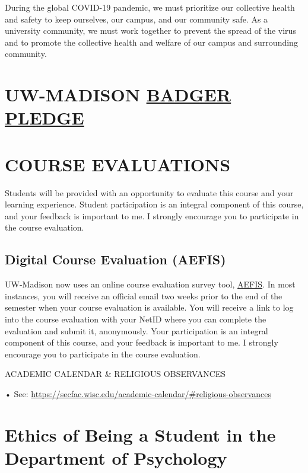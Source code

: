 \documentclass[11pt,man]{article}
\begin{document}
During the global COVID-19 pandemic, we must prioritize our collective
health and safety to keep ourselves, our campus, and our community safe.
As a university community, we must work together to prevent the spread
of the virus and to promote the collective health and welfare of our
campus and surrounding community.

\hypertarget{uw-madison-badger-pledge}{%
\section{\texorpdfstring{UW-MADISON
\href{https://smartrestart.wisc.edu/badgerpledge/}{BADGER
PLEDGE}}{UW-MADISON BADGER PLEDGE}}\label{uw-madison-badger-pledge}}

\hypertarget{course-evaluations}{%
\section{COURSE EVALUATIONS}\label{course-evaluations}}

Students will be provided with an opportunity to evaluate this course
and your learning experience. Student participation is an integral
component of this course, and your feedback is important to me. I
strongly encourage you to participate in the course evaluation.

\hypertarget{digital-course-evaluation-aefis}{%
\subsection{Digital Course Evaluation
(AEFIS)}\label{digital-course-evaluation-aefis}}

UW-Madison now uses an online course evaluation survey tool,
\href{https://assessment.provost.wisc.edu/course-evaluation-surveys/}{AEFIS}.
In most instances, you will receive an official email two weeks prior to
the end of the semester when your course evaluation is available. You
will receive a link to log into the course evaluation with your NetID
where you can complete the evaluation and submit it, anonymously. Your
participation is an integral component of this course, and your feedback
is important to me. I strongly encourage you to participate in the
course evaluation.

ACADEMIC CALENDAR \& RELIGIOUS OBSERVANCES

• See:
\url{https://secfac.wisc.edu/academic-calendar/\#religious-observances}

\hypertarget{ethics-of-being-a-student-in-the-department-of-psychology}{%
\section{Ethics of Being a Student in the Department of
Psychology}\label{ethics-of-being-a-student-in-the-department-of-psychology}}
\end{document}
